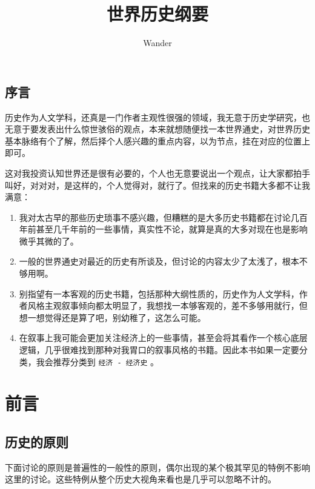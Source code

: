 \documentclass[12pt,oneside]{book}
\title{世界历史纲要}
\author{Wander}
\begin{document}
\makemytitle



\frontmatter 
{}
\chapter*{序言}
历史作为人文学科，还真是一门作者主观性很强的领域，我无意于历史学研究，也无意于要发表出什么惊世骇俗的观点，本来就想随便找一本世界通史，对世界历史基本脉络有个了解，然后择个人感兴趣的重点内容，以为节点，挂在对应的位置上即可。

这对我投资认知世界还是很有必要的，个人也无意要说出一个观点，让大家都拍手叫好，对对对，是这样的，个人觉得对，就行了。但找来的历史书籍大多都不让我满意：

\begin{enumerate}
\item 我对太古早的那些历史琐事不感兴趣，但糟糕的是大多历史书籍都在讨论几百年前甚至几千年前的一些事情，真实性不论，就算是真的大多对现在也是影响微乎其微的了。
\item 一般的世界通史对最近的历史有所谈及，但讨论的内容太少了太浅了，根本不够用啊。
\item 别指望有一本客观的历史书籍，包括那种大纲性质的，历史作为人文学科，作者风格主观叙事倾向都太明显了，我想找一本够客观的，差不多够用就行，但想一想觉得还是算了吧，别幼稚了，这怎么可能。
\item 在叙事上我可能会更加关注经济上的一些事情，甚至会将其看作一个核心底层逻辑，几乎很难找到那种对我胃口的叙事风格的书籍。因此本书如果一定要分类，我会推荐分类到 \verb+经济 - 经济史+ 。
\end{enumerate}





\setcounter{tocdepth}{2}    
\tableofcontents



\mainmatter

\part{前言}
\chapter{历史的原则}
下面讨论的原则是普遍性的一般性的原则，偶尔出现的某个极其罕见的特例不影响这里的讨论。这些特例从整个历史大视角来看也是几乎可以忽略不计的。
\end{document}
